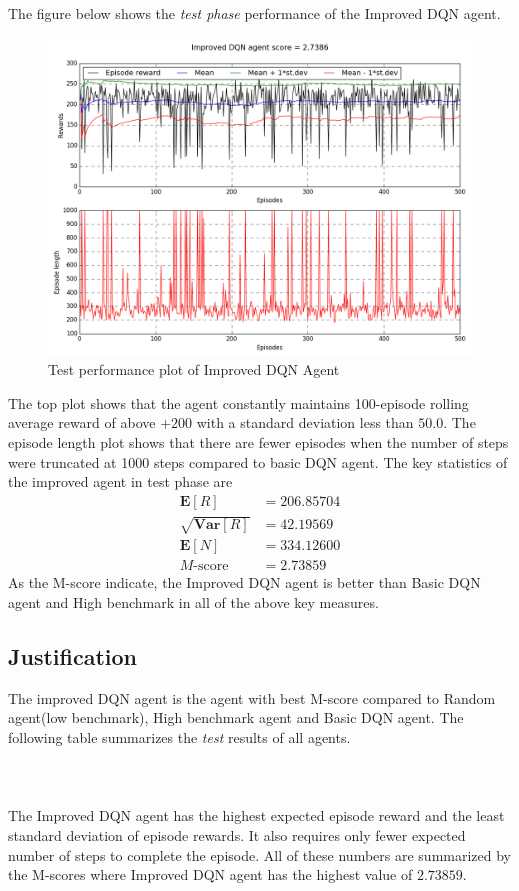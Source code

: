 \documentclass{article}
\begin{document}
The figure below shows the \textit{test phase} performance of the Improved DQN agent.
\begin{figure}[H]
	\caption{Test performance plot of Improved DQN Agent}
	\centering
	\includegraphics[width=13cm,trim={0 0 0 0},clip]{img/fulldqn}
\end{figure}
The top plot shows that the agent constantly maintains 100-episode rolling average reward of above $+200$ with a standard deviation less than $50.0$. The episode length plot shows that there are fewer episodes when the number of steps were truncated at 1000 steps compared to basic DQN agent. The key statistics of the improved agent in test phase are
\begin{align*}
\mathbf{E}[R] &= 206.85704\\ \sqrt{\mathbf{Var}[R]} &= 42.19569\\\mathbf{E}[N] &= 334.12600\\ M\text{-score} &= 2.73859
\end{align*}
As the M-score indicate, the Improved DQN agent is better than Basic DQN agent and High benchmark in all of the above key measures.
\subsection*{Justification}
The improved DQN agent is the agent with best M-score compared to Random agent(low benchmark), High benchmark agent and Basic DQN agent. The following table summarizes the \textit{test} results of all agents.\\\\
\\\\
The Improved DQN agent has the highest expected episode reward and the least standard deviation of episode rewards. It also requires only fewer expected number of steps to complete the episode. All of these numbers are summarized by the M-scores where Improved DQN agent has the highest value of $2.73859$.
\end{document}
